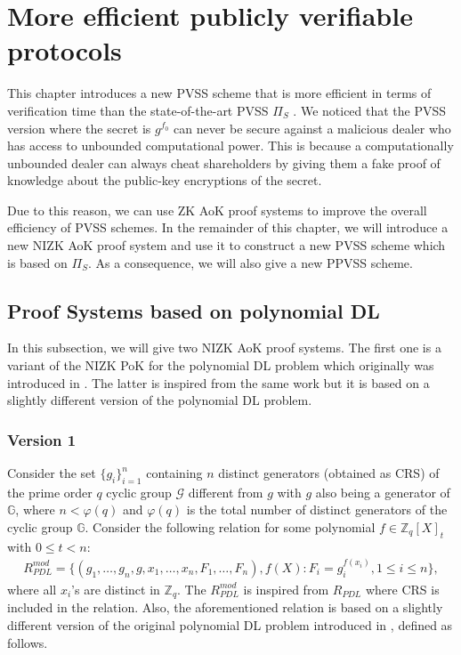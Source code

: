 \chapter{More efficient publicly verifiable protocols}
\label{cha:2}
This chapter introduces a new PVSS scheme that is more efficient in terms of verification time 
than the state-of-the-art PVSS $\Pi_{S}$ \cite{cryptoeprint:2023/1669}. We noticed that the 
PVSS version where the secret is $g^{f_0}$ can never be secure against a malicious dealer who 
has access to unbounded computational power. This is because a computationally unbounded 
dealer can always cheat shareholders by giving them a fake proof of knowledge about the 
public-key encryptions of the secret.\par 

Due to this reason, we can use ZK AoK proof systems to improve the overall efficiency of 
PVSS schemes. In the remainder of this chapter, we will introduce a new NIZK AoK proof system 
and use it to construct a new PVSS scheme which is based on $\Pi_S$. As a consequence, 
we will also give a new PPVSS scheme.

\section{Proof Systems based on polynomial DL}
In this subsection, we will give two NIZK AoK proof systems. The first one is a variant of 
the NIZK PoK for the polynomial DL problem which originally was introduced in \cite{cryptoeprint:2023/1669}. 
The latter is inspired from the same work but it is based on a slightly different version of 
the polynomial DL problem.

\subsection{Version 1}
\label{subsec:AoK_R_pdl}
Consider the set $\{g_i\}_{i=1}^n$ containing $n$ distinct generators (obtained as CRS) of 
the prime order $q$ cyclic group $\mathcal{G}$ different from $g$ with $g$ also being a generator of 
$\mathbb{G}$, where $n<\varphi(q)$ and $\varphi(q)$ is 
the total number of distinct generators of the cyclic group $\mathbb{G}$. Consider the following relation for 
some polynomial $f\in\mathbb{Z}_q[X]_{t}$ with $0\leq t< n$:
\begin{align}\label{eq:relation_mod_PDL_ultimate}
  R_{PDL}^{mod} = \{(g_1,\dots,g_n,g,x_1,\dots,x_n,F_1,\dots,F_n),f(X) : F_i=g_i^{f(x_i)}, 1\leq i\leq n\},
\end{align}
where all $x_i$'s are distinct in $\mathbb{Z}_q$. The $R_{PDL}^{mod}$ is inspired from $R_{PDL}$ where 
CRS is included in the relation. Also, the aforementioned relation is based on a slightly 
different version of the original polynomial DL problem introduced in \cite{cryptoeprint:2023/1669}, 
defined as follows.

